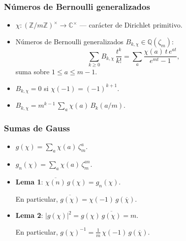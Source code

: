 \documentclass{beamer}
\newcommand{\ZZ}{\mathbb{Z}}
\newcommand{\QQ}{\mathbb{Q}}
\newcommand{\CC}{\mathbb{C}}
\begin{document}

\begin{frame}
  \frametitle{Números de Bernoulli generalizados}

  \begin{itemize}
  \item<1-> $\chi\colon (\ZZ/m\ZZ)^\times \to \CC^\times$ --- carácter de Dirichlet primitivo.

  \item<2-> Números de Bernoulli generalizados $B_{k,\chi} \in \QQ (\zeta_m)$:
    $$\sum_{k\ge 0} B_{k,\chi}\,\frac{t^k}{k!} = \sum_a \frac{\chi (a)\,t\,e^{at}}{e^{mt} - 1},$$
    suma sobre $1 \le a \le m-1$.
  \end{itemize}

  \begin{itemize}
  \item<3-> $B_{k,\chi} = 0$ si $\chi (-1) = (-1)^{k+1}$.

  \item<4-> $B_{k,\chi} = m^{k-1} \, \sum_a \chi (a)\,B_k (a/m)$.
  \end{itemize}
\end{frame}


\begin{frame}
  \frametitle{Sumas de Gauss}

  \begin{itemize}
  \item<1-> $g (\chi) = \sum_a \chi (a) \, \zeta_m^a$.

  \item<2-> $g_n (\chi) = \sum_a \chi (a) \, \zeta_m^{an}$.

  \item<3-> \textbf{Lema 1}: $\overline{\chi (n)} \, g (\chi) = g_n (\chi)$.

    En particular, $\overline{g (\chi)} = \chi (-1)\,g (\overline{\chi})$.

  \item<4-> \textbf{Lema 2}: $|g (\chi)|^2 = g (\chi)\,\overline{g (\chi)} = m$.

  En particular,
  $g (\chi)^{-1} = \frac{1}{m}\,\chi (-1)\,g (\overline{\chi})$.
  \end{itemize}
\end{frame}

\end{document}
